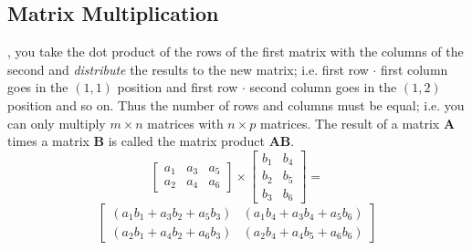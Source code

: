 \documentclass{tufte-book}
\begin{document}
\subsection{Matrix Multiplication}
, you take the dot product of the rows of the first matrix with the columns of the
second and \emph{distribute} the results to the new matrix; i.e. first row $\cdot$ first column goes in the $(1,1)$
position and first row $\cdot$ second column goes in the $(1,2)$ position and so on. Thus the number of rows and columns
must be equal; i.e. you can only multiply $m \times n$ matrices with $n \times p$ matrices. The result of a matrix
\textbf{A} times a matrix \textbf{B} is called the matrix product \textbf{AB}.
\begin{equation*}
	\begin{bmatrix}
		a_1 & a_3 & a_5 \\
		a_2 & a_4 & a_6
	\end{bmatrix}
	\times
	\begin{bmatrix}
		b_1 & b_4 \\
		b_2 & b_5 \\
		b_3 & b_6
	\end{bmatrix}
	=
\end{equation*}
\begin{equation*}
	\begin{bmatrix}
		(a_1b_1+a_3b_2+a_5b_3) & (a_1b_4+a_3b_4+a_5b_6) \\
		(a_2b_1+a_4b_2+a_6b_3) & (a_2b_4+a_4b_5+a_6b_6)
	\end{bmatrix}
\end{equation*}
\end{document}
